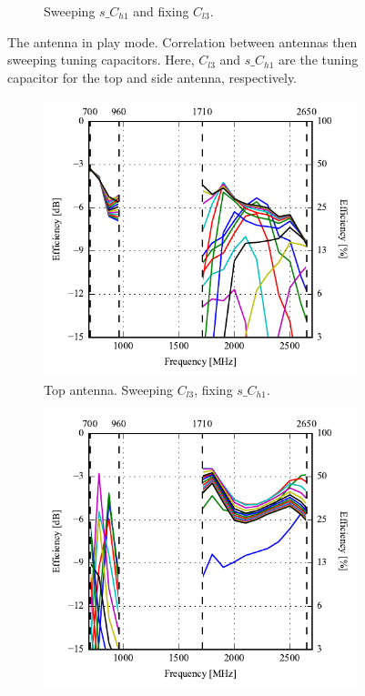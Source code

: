 \begin{figure}[htbp]
\begin{subfigure}{0.49\linewidth}
        \caption{Sweeping $s\_C_{h1}$ and fixing $C_{l3}$.}
    \end{subfigure}
    \caption{The antenna in play mode. Correlation between antennas then sweeping tuning capacitors. Here, $C_{l3}$ and $s\_C_{h1}$ are the tuning capacitor for the top and side antenna, respectively.}
    \label{fig:corr_sol3_play}
\end{figure}

\begin{figure}[htbp]
    \centering
    \begin{subfigure}{0.49\linewidth}
        \centering
        \includegraphics{img/tech_sol/nonresonant/simulation/play_mode/EffSweepAC1/efficiency-ac1-top}
        \caption{Top antenna. Sweeping $C_{l3}$, fixing $s\_C_{h1}$.}
    \end{subfigure}
    \hfill
    \begin{subfigure}{0.49\linewidth}
        \centering
        \includegraphics{img/tech_sol/nonresonant/simulation/play_mode/EffSweepAC2/efficiency-ac2-side}

\end{subfigure}
\end{figure}
